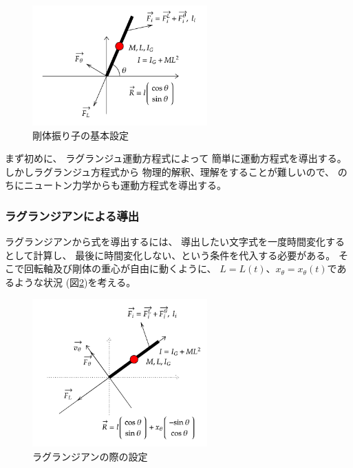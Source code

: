 \documentclass[a4paper,11pt]{jsarticle}
\begin{document}
\begin{figure}[h]
  \centering
  \includegraphics[width = 0.6\textwidth]{Appendix_base_config.png}
  \caption{剛体振り子の基本設定}
  \label{Appendix_base_config.png}
\end{figure}

まず初めに、
ラグランジュ運動方程式によって
簡単に運動方程式を導出する。
しかしラグランジュ方程式から
物理的解釈、理解をすることが難しいので、
のちにニュートン力学からも運動方程式を導出する。

\subsubsection{ラグランジアンによる導出}

ラグランジアンから式を導出するには、
導出したい文字式を一度時間変化するとして計算し、
最後に時間変化しない、という条件を代入する必要がある。
そこで回転軸及び剛体の重心が自由に動くように、
$L=L(t)$、$x_\theta=x_\theta(t)$であるような状況
(図\ref{Appendix_lag_config.png})を考える。

\begin{figure}[h]
  \centering
  \includegraphics[width = 0.6\textwidth]{Appendix_lag_config.png}
  \caption{ラグランジアンの際の設定}
  \label{Appendix_lag_config.png}
\end{figure}
\end{document}
